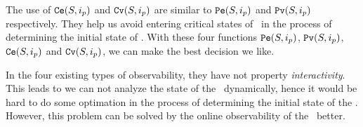The use of ${\tt Ce}(S, i_p)$ and ${\tt Cv}(S, i_p)$ are similar to ${\tt Pe}(S, i_p)$ and ${\tt Pv}(S, i_p)$ respectively. They help us avoid entering critical states of \BCNs\ in the process of determining the initial state of \BCNs. With these four functions ${\tt Pe}(S, i_p)$, ${\tt Pv}(S, i_p)$, ${\tt Ce}(S, i_p)$ and ${\tt Cv}(S, i_p)$, we can make the best decision we like. 

In the four existing types of observability, they have not property {\em interactivity}. This leads to we can not analyze the state of the \BCNs\ dynamically, hence it would be hard to do some optimation in the process of determining the initial state of the \BCNs. However, this problem can be solved by the online observability of the \BCNs\ better.